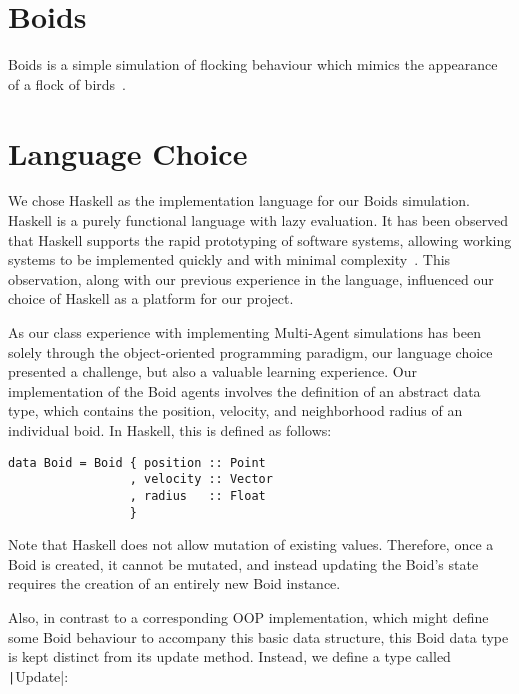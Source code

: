 

\MYHEADERS{}

\section{Boids}

Boids is a simple simulation of flocking behaviour which mimics the appearance of a flock of birds~\cite{hartman2006autonomous}.


\section{Language Choice}

We chose Haskell as the implementation language for our Boids simulation.
Haskell is a purely functional language with lazy evaluation. It has been observed that Haskell supports the rapid prototyping of software systems, allowing working systems to be implemented quickly and with minimal complexity~\cite{hudak1994haskell}. This observation, along with our previous experience in the language, influenced our choice of Haskell as a platform for our project.

As our class experience with implementing Multi-Agent simulations has been solely through the object-oriented programming paradigm, our language choice presented a challenge, but also a valuable learning experience. Our
implementation of the Boid agents involves the definition of an abstract data
type, which contains the position, velocity, and neighborhood radius of an
individual boid. In Haskell, this is defined as follows:

\begin{verbatim}
data Boid = Boid { position :: Point
                 , velocity :: Vector
                 , radius   :: Float
                 }
\end{verbatim}

Note that Haskell does not allow mutation of existing values. Therefore, once a
Boid is created, it cannot be mutated, and instead updating the Boid’s state
requires the creation of an entirely new Boid instance.

Also, in contrast to a corresponding OOP implementation, which might define some Boid behaviour to accompany this basic data structure, this Boid data type is kept distinct from its update method. Instead, we define a type called \texttt|Update|:


